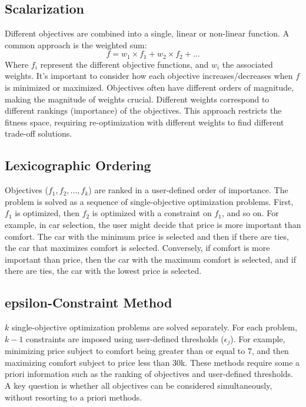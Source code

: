 \subsection*{Scalarization}
Different objectives are combined into a single, linear or non-linear function.  A common approach is the weighted sum:
\begin{equation*}
f = w_1 \times f_1 + w_2 \times f_2 + ...
\end{equation*}
Where $f_i$ represent the different objective functions, and $w_i$ the associated weights.
It's important to consider how each objective increases/decreases when $f$ is minimized or maximized.
Objectives often have different orders of magnitude, making the magnitude of weights crucial.
Different weights correspond to different rankings (importance) of the objectives. This approach restricts the fitness space, requiring re-optimization with different weights to find different trade-off solutions.

\subsection*{Lexicographic Ordering}
Objectives ($f_1, f_2, ..., f_k$) are ranked in a user-defined order of importance.
The problem is solved as a sequence of single-objective optimization problems.
First, $f_1$ is optimized, then $f_2$ is optimized with a constraint on $f_1$, and so on. For example, in car selection, the user might decide that price is more important than comfort.  The car with the minimum price is selected and then if there are ties, the car that maximizes comfort is selected. Conversely, if comfort is more important than price, then the car with the maximum comfort is selected, and if there are ties, the car with the lowest price is selected.

\subsection*{epsilon-Constraint Method}
$k$ single-objective optimization problems are solved separately.
For each problem, $k-1$ constraints are imposed using user-defined thresholds ($\epsilon_j$). For example, minimizing price subject to comfort being greater than or equal to 7, and then maximizing comfort subject to price less than 30k.
These methods require some a priori information such as the ranking of objectives and user-defined thresholds.
A key question is whether all objectives can be considered simultaneously, without resorting to a priori methods.

